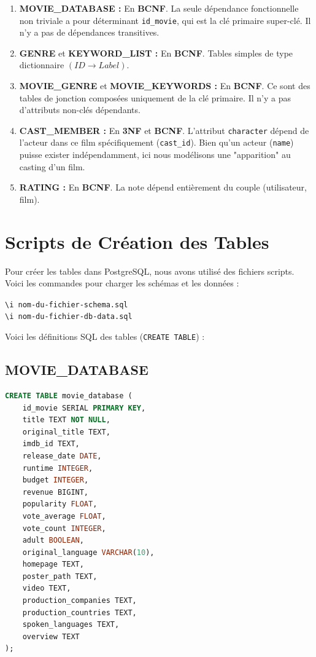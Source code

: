 \documentclass[12pt]{article}
\begin{document}
\begin{enumerate}
    \item \textbf{MOVIE\_DATABASE :} En \textbf{BCNF}. La seule dépendance fonctionnelle non triviale a pour déterminant \texttt{id\_movie}, qui est la clé primaire super-clé. Il n'y a pas de dépendances transitives.

    \item \textbf{GENRE} et \textbf{KEYWORD\_LIST :} En \textbf{BCNF}. Tables simples de type dictionnaire $(ID \rightarrow Label)$.

    \item \textbf{MOVIE\_GENRE} et \textbf{MOVIE\_KEYWORDS :} En \textbf{BCNF}. Ce sont des tables de jonction composées uniquement de la clé primaire. Il n'y a pas d'attributs non-clés dépendants.

    \item \textbf{CAST\_MEMBER :} En \textbf{3NF} et \textbf{BCNF}. L'attribut \texttt{character} dépend de l'acteur dans ce film spécifiquement (\texttt{cast\_id}). Bien qu'un acteur (\texttt{name}) puisse exister indépendamment, ici nous modélisons une "apparition" au casting d'un film.

    \item \textbf{RATING :} En \textbf{BCNF}. La note dépend entièrement du couple (utilisateur, film).
\end{enumerate}

\section{Scripts de Création des Tables}

Pour créer les tables dans PostgreSQL, nous avons utilisé des fichiers scripts. Voici les commandes pour charger les schémas et les données :

\begin{center}
    \texttt{\textbackslash i nom-du-fichier-schema.sql} \\
    \texttt{\textbackslash i nom-du-fichier-db-data.sql}
\end{center}

Voici les définitions SQL des tables (\texttt{CREATE TABLE}) :

\subsection{MOVIE\_DATABASE}
\begin{lstlisting}[language=SQL]
CREATE TABLE movie_database (
    id_movie SERIAL PRIMARY KEY, 
    title TEXT NOT NULL,
    original_title TEXT,
    imdb_id TEXT, 
    release_date DATE, 
    runtime INTEGER, 
    budget INTEGER, 
    revenue BIGINT, 
    popularity FLOAT, 
    vote_average FLOAT, 
    vote_count INTEGER,
    adult BOOLEAN, 
    original_language VARCHAR(10),
    homepage TEXT,
    poster_path TEXT, 
    video TEXT, 
    production_companies TEXT, 
    production_countries TEXT, 
    spoken_languages TEXT, 
    overview TEXT 
);
\end{lstlisting}
\end{document}
